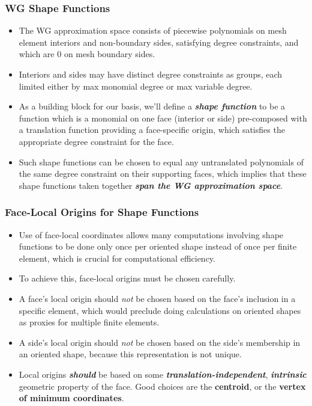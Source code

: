 \documentclass[compress]{beamer}
\begin{document}
\begin{frame}
  \frametitle{WG Shape Functions}
  \begin{itemize}[<+->]
    \item The WG approximation space consists of piecewise polynomials on mesh element interiors and non-boundary sides,
      satisfying degree constraints, and which are 0 on mesh boundary sides.
    \item Interiors and sides may have distinct degree constraints as groups, each limited either by max monomial degree or max variable degree.
    \item As a building block for our basis, we'll define a \emph{\textbf{shape function}} to be a function which is a monomial on one face
      (interior or side) pre-composed with a translation function providing a face-specific origin, which satisfies the appropriate
      degree constraint for the face.
    \item Such shape functions can be chosen to equal any untranslated polynomials of the same degree constraint on their supporting faces,
      which implies that these shape functions taken together \emph{\textbf{span the WG approximation space}}. 
  \end{itemize}
\end{frame}


\begin{frame}
  \frametitle{Face-Local Origins for Shape Functions}
  \begin{itemize}[<+->]
    \item Use of face-local coordinates allows many computations involving shape functions to be done only once per oriented shape
      instead of once per finite element, which is crucial for computational efficiency.
    \item To achieve this, face-local origins must be chosen carefully.
    \item A face's local origin should \emph{not} be chosen based on the face's inclusion in a specific element, which would preclude doing
          calculations on oriented shapes as proxies for multiple finite elements.
    \item A side's local origin should \emph{not} be chosen based on the side's membership in an oriented shape, because this representation
      is not unique.
    \item Local origins \emph{\textbf{should}} be based on some \emph{\textbf{translation-independent}}, \emph{\textbf{intrinsic}} geometric
      property of the face. Good choices are the \textbf{centroid}, or the \textbf{vertex of minimum coordinates}.
  \end{itemize}
\end{frame}
\end{document}
